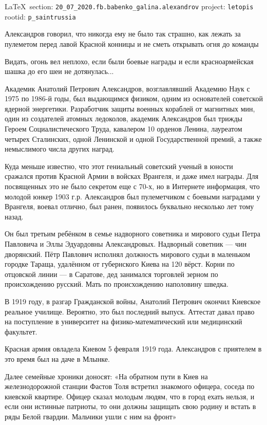 \documentclass[a4paper,11pt]{extreport}
\begin{document}
\vspace{0.5cm}
{\small\LaTeX~section: \verb|20_07_2020.fb.babenko_galina.alexandrov| project: \verb|letopis| rootid: \verb|p_saintrussia|}
\vspace{0.5cm}


Александров говорил, что никогда ему не было так страшно, как лежать за
пулеметом перед лавой Красной конницы и не сметь открывать огня до команды

Видать, огонь вел неплохо, если были боевые награды и если красноармейская
шашка до его шеи не дотянулась...

Академик Анатолий Петрович Александров, возглавлявший Академию Наук с 1975 по
1986-й годы, был выдающимся физиком, одним из основателей советской ядерной
энергетики. Разработчик защиты военных кораблей от магнитных мин, один из
создателей атомных ледоколов, академик Александров был трижды Героем
Социалистического Труда, кавалером 10 орденов Ленина, лауреатом четырех
Сталинских, одной Ленинской и одной Государственной премий, а также немыслимого
числа других наград.

Куда меньше известно, что этот гениальный советский ученый в юности сражался
против Красной Армии в войсках Врангеля, и даже имел награды. Для посвященных
это не было секретом еще с 70-х, но в Интернете информация, что молодой юнкер
1903 г.р. Александров был пулеметчиком с боевыми наградами у Врангеля, воевал
отлично, был ранен, появилось буквально несколько лет тому назад.

Он был третьим ребёнком в семье надворного советника и мирового судьи Петра
Павловича и Эллы Эдуардовны Александровых. Надворный советник --- чин дворянский.
Пётр Павлович исполнял должность мирового судьи в маленьком городке Тараща,
удалённом от губернского Киева на 120 вёрст. Корни по отцовской линии --- в
Саратове, дед занимался торговлей зерном по происхождению русский. Мать по
происхождению наполовину шведка.

В 1919 году, в разгар Гражданской войны, Анатолий Петрович окончил Киевское
реальное училище. Вероятно, это был последний выпуск. Аттестат давал право на
поступление в университет на физико-математический или медицинский факультет.

Красная армия овладела Киевом 5 февраля 1919 года. Александров с приятелем в
это время был на даче в Млынке.

Далее семейные хроники доносят: «На обратном пути в Киев на железнодорожной
станции Фастов Толя встретил знакомого офицера, соседа по киевской квартире.
Офицер сказал молодым людям, что в город ехать нельзя, и если они истинные
патриоты, то они должны защищать свою родину и встать в ряды Белой гвардии.
Мальчики ушли с ним на фронт»
\end{document}
